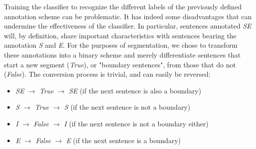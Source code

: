 Training the classifier to recognize the different labels of the previously defined annotation scheme can be problematic. It has indeed some disadvantages that can undermine the effectiveness of the classifier. In particular, sentences annotated \textit{SE} will, by definition, share important characteristics with sentences bearing the annotation \textit{S} and \textit{E}. For the purposes of segmentation, we chose to transform these annotations into a binary scheme and merely differentiate sentences that start a new segment (\textit{True}), or "boundary sentences", from those that do not (\textit{False}). The conversion process is trivial, and can easily be reversed:

\begin{itemize}
    \item \textit{SE} $\longrightarrow$ \textit{True} $\longrightarrow$ \textit{SE} (if the next sentence is also a boundary)
    \item \textit{S} $\longrightarrow$ \textit{True} $\longrightarrow$ \textit{S} (if the next sentence is not a boundary)
    \item \textit{I} $\longrightarrow$ \textit{False} $\longrightarrow$ \textit{I} (if the next sentence is not a boundary either)
    \item \textit{E} $\longrightarrow$ \textit{False} $\longrightarrow$ \textit{E} (if the next sentence is a boundary)
\end{itemize}

